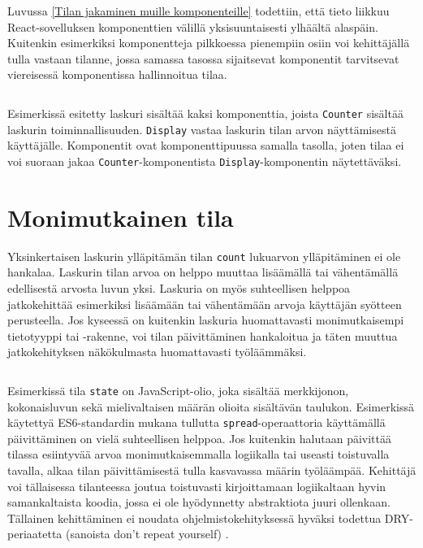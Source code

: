 Luvussa \ref{Tilan jakaminen muille komponenteille} todettiin, että tieto liikkuu React-sovelluksen komponenttien välillä yksisuuntaisesti ylhäältä alaspäin. Kuitenkin esimerkiksi komponentteja pilkkoessa pienempiin osiin voi kehittäjällä tulla vastaan tilanne, jossa samassa tasossa sijaitsevat komponentit tarvitsevat viereisessä komponentissa hallinnoitua tilaa.
\inputminted[bgcolor=black]{jsx.py:JsxLexer -x}{listaukset/horizontalstate.js}
Esimerkissä esitetty laskuri sisältää kaksi komponenttia, joista \texttt{Counter} sisältää laskurin toiminnallisuuden. \texttt{Display} vastaa laskurin tilan arvon näyttämisestä käyttäjälle. Komponentit ovat komponenttipuussa samalla tasolla, joten tilaa ei voi suoraan jakaa \texttt{Counter}-komponentista \texttt{Display}-komponentin näytettäväksi.


\section{Monimutkainen tila}
\label{Monimutkainen tila}

Yksinkertaisen laskurin ylläpitämän tilan \texttt{count} lukuarvon ylläpitäminen ei ole hankalaa. Laskurin tilan arvoa on helppo muuttaa lisäämällä tai vähentämällä edellisestä arvosta luvun yksi. Laskuria on myös suhteellisen helppoa jatkokehittää esimerkiksi lisäämään tai vähentämään arvoja käyttäjän syötteen perusteella. Jos kyseessä on kuitenkin laskuria huomattavasti monimutkaisempi tietotyyppi tai -rakenne, voi tilan päivittäminen hankaloitua ja täten muuttua jatkokehityksen näkökulmasta huomattavasti työläämmäksi.
\inputminted[bgcolor=black,samepage]{jsx.py:JsxLexer -x}{listaukset/complexstate.js}
Esimerkissä tila \texttt{state} on JavaScript-olio, joka sisältää merkkijonon, kokonaisluvun sekä mielivaltaisen määrän olioita sisältävän taulukon. Esimerkissä käytettyä ES6-standardin mukana tullutta \texttt{spread}-operaattoria käyttämällä päivittäminen on vielä suhteellisen helppoa. Jos kuitenkin halutaan päivittää tilassa esiintyvää arvoa monimutkaisemmalla logiikalla tai useasti toistuvalla tavalla, alkaa tilan päivittämisestä tulla kasvavassa määrin työläämpää. Kehittäjä voi tällaisessa tilanteessa joutua toistuvasti kirjoittamaan logiikaltaan hyvin samankaltaista koodia, jossa ei ole hyödynnetty abstraktiota juuri ollenkaan. Tällainen kehittäminen ei noudata ohjelmistokehityksessä hyväksi todettua DRY-periaatetta (sanoista don't repeat yourself) \cite{dry1} \cite{dry2}.